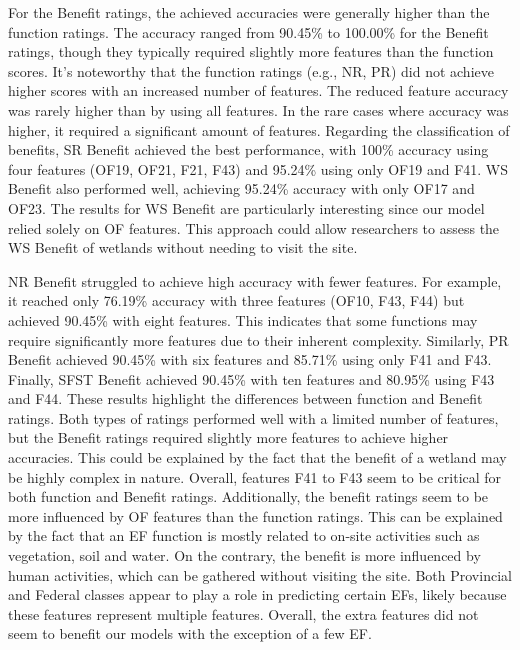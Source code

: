 \documentclass[12pt,letterpaper]{article}
\begin{document}
For the Benefit ratings, the achieved accuracies were generally higher than the function ratings.
The accuracy ranged from 90.45\% to 100.00\% for the Benefit ratings, though they typically required slightly more features than the function scores.
It's noteworthy that the function ratings (e.g., \ac{NR}, \ac{PR}) did not achieve higher scores with an increased number of features.
The reduced feature accuracy was rarely higher than by using all features.
In the rare cases where accuracy was higher, it required a significant amount of features.
Regarding the classification of benefits, \ac{SR} Benefit achieved the best performance, with 100\% accuracy using four features (OF19, OF21, F21, F43) and 95.24\% using only OF19 and F41.
\ac{WS} Benefit also performed well, achieving 95.24\% accuracy with only OF17 and OF23.
The results for \ac{WS} Benefit are particularly interesting since our model relied solely on \ac{OF} features.
This approach could allow researchers to assess the \ac{WS} Benefit of wetlands without needing to visit the site.

\ac{NR} Benefit struggled to achieve high accuracy with fewer features.
For example, it reached only 76.19\% accuracy with three features (OF10, F43, F44) but achieved 90.45\% with eight features.
This indicates that some functions may require significantly more features due to their inherent complexity.
Similarly, \ac{PR} Benefit achieved 90.45\% with six features and 85.71\% using only F41 and F43.
Finally, \ac{SFST} Benefit achieved 90.45\% with ten features and 80.95\% using F43 and F44.
These results highlight the differences between function and Benefit ratings.
Both types of ratings performed well with a limited number of features, but the Benefit ratings required slightly more features to achieve higher accuracies.
This could be explained by the fact that the benefit of a wetland may be highly complex in nature.
Overall, features F41 to F43 seem to be critical for both function and Benefit ratings.
Additionally, the benefit ratings seem to be more influenced by \ac{OF} features than the function ratings.
This can be explained by the fact that an \ac{EF} function is mostly related to on-site activities such as vegetation, soil and water.
On the contrary, the benefit is more influenced by human activities, which can be gathered without visiting the site.
Both Provincial and Federal classes appear to play a role in predicting certain \acp{EF}, likely because these features represent multiple features.
Overall, the extra features did not seem to benefit our models with the exception of a few \ac{EF}.
\end{document}

